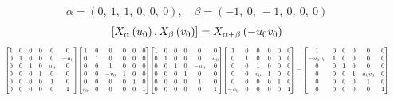 \documentclass[11pt]{article}
\theoremstyle{definition}
\begin{document}
\[
\alpha = \left( 0, \  1, \  1, \  0, \  0, \  0\right), \quad \beta = \left( -1, \  0, \  -1, \  0, \  0, \  0\right)
\]
\[
\scaletoalign{\textwidth}{\left[ X_{\alpha}\left(u_{0}\right), X_{\beta}\left(v_{0}\right) \right] = X_{\alpha + \beta}\left(- u_{0} v_{0}\right)}
\]
\[
\scaletoalign{\textwidth}{{\left[\begin{matrix}1 & 0 & 0 & 0 & 0 & 0\\0 & 1 & 0 & 0 & 0 & - u_{0}\\0 & 0 & 1 & 0 & u_{0} & 0\\0 & 0 & 0 & 1 & 0 & 0\\0 & 0 & 0 & 0 & 1 & 0\\0 & 0 & 0 & 0 & 0 & 1\end{matrix}\right]} {\left[\begin{matrix}1 & 0 & 0 & 0 & 0 & 0\\0 & 1 & 0 & 0 & 0 & 0\\0 & 0 & 1 & 0 & 0 & 0\\0 & 0 & - v_{0} & 1 & 0 & 0\\0 & 0 & 0 & 0 & 1 & 0\\v_{0} & 0 & 0 & 0 & 0 & 1\end{matrix}\right]} {\left[\begin{matrix}1 & 0 & 0 & 0 & 0 & 0\\0 & 1 & 0 & 0 & 0 & u_{0}\\0 & 0 & 1 & 0 & - u_{0} & 0\\0 & 0 & 0 & 1 & 0 & 0\\0 & 0 & 0 & 0 & 1 & 0\\0 & 0 & 0 & 0 & 0 & 1\end{matrix}\right]} {\left[\begin{matrix}1 & 0 & 0 & 0 & 0 & 0\\0 & 1 & 0 & 0 & 0 & 0\\0 & 0 & 1 & 0 & 0 & 0\\0 & 0 & v_{0} & 1 & 0 & 0\\0 & 0 & 0 & 0 & 1 & 0\\- v_{0} & 0 & 0 & 0 & 0 & 1\end{matrix}\right]} = {\left[\begin{matrix}1 & 0 & 0 & 0 & 0 & 0\\- u_{0} v_{0} & 1 & 0 & 0 & 0 & 0\\0 & 0 & 1 & 0 & 0 & 0\\0 & 0 & 0 & 1 & u_{0} v_{0} & 0\\0 & 0 & 0 & 0 & 1 & 0\\0 & 0 & 0 & 0 & 0 & 1\end{matrix}\right]}}
\]
\end{document}
